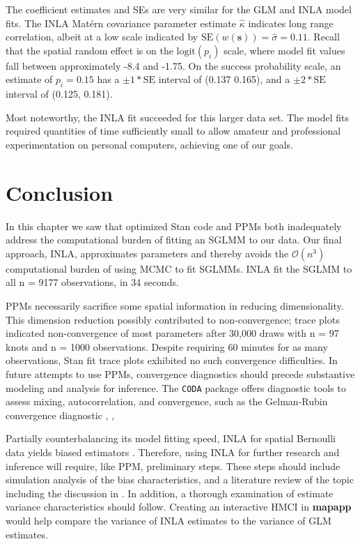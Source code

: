 The coefficient estimates and SEs are very similar for the GLM and INLA model fits. The INLA Mat\'ern covariance parameter estimate $\hat{\kappa}$ indicates long range correlation, albeit at a low scale indicated by $\text{SE}(w(\pmb{s})) = \hat{\sigma} = 0.11$. Recall that the spatial random effect is on the $\text{logit}(p_{i})$ scale, where model fit values fall between approximately -8.4 and -1.75. On the success probability scale, an estimate of $p_{i} = 0.15$ has a $\pm 1*\text{SE}$ interval of (0.137 0.165), and a $\pm 2*\text{SE}$ interval of (0.125, 0.181).

Most noteworthy, the INLA fit succeeded for this larger data set. The model fits required quantities of time sufficiently small to allow amateur and professional experimentation on personal computers, achieving one of our goals.

\section{Conclusion}
In this chapter we saw that optimized Stan code and PPMs both inadequately address the computational burden of fitting an SGLMM to our data. Our final approach, INLA, approximates parameters and thereby avoids the $\mathcal{O}(n^{3})$ computational burden of using MCMC to fit SGLMMs. INLA fit the SGLMM to all n = 9177 observations, in 34 seconds.

PPMs necessarily sacrifice some spatial information in reducing dimensionality. This dimension reduction possibly contributed to non-convergence; trace plots indicated non-convergence of most parameters after 30,000 draws with n = 97 knots and n = 1000 observations. Despite requiring 60 minutes for as many observations, Stan fit trace plots exhibited no such convergence difficulties. In future attempts to use PPMs, convergence diagnostics should precede substantive modeling and analysis for inference. The \verb|CODA| package offers diagnostic tools to assess mixing, autocorrelation, and convergence, such as the Gelman-Rubin convergence diagnostic \citep{CODA}, \citep{Gelman2014}, \citep{Brooks1998}

Partially counterbalancing its model fitting speed, INLA for spatial Bernoulli data yields biased estimators \citep{Mondal2017}. Therefore, using INLA for further research and inference will require, like PPM, preliminary steps. These steps should include simulation analysis of the bias characteristics, and a literature review of the topic including the discussion in \cite{Rue2007}. In addition, a thorough examination of estimate variance characteristics should follow. Creating an interactive HMCI in {\bf mapapp} would help compare the variance of INLA estimates to the variance of GLM estimates.

